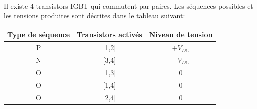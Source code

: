 \documentclass[11pt,letterpaper,final]{report}
\begin{document}
\paragraph{}Il existe 4 transistors IGBT qui commutent par paires. Les séquences possibles et les tensions produites sont décrites dans le tableau suivant:

\begin{table}[htb]
\centering
\begin{tabular}{ |c|c|c| }
\hline
  Type de séquence & Transistors activés & Niveau de tension \\\hline\hline
  P & [1,2] & $+V_{DC}$ \\\hline
  N & [3,4] & $-V_{DC}$ \\\hline
  O & [1,3] & $0$ \\\hline
  O & [1,4] & $0$ \\\hline
  O & [2,4] & $0$ \\\hline
\end{tabular}
\end{table}
\end{document}
